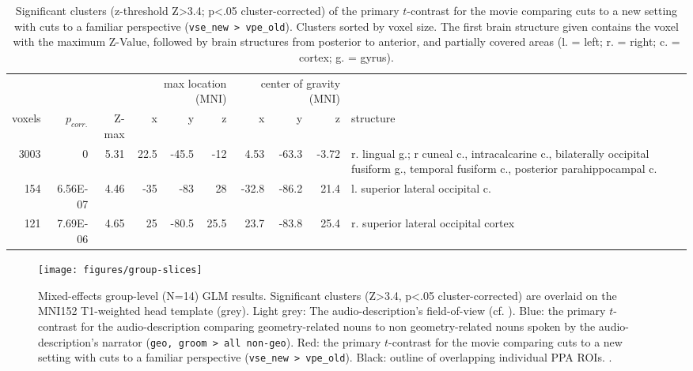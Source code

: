 \documentclass[english]{article}
\begin{document}
\begin{table}[t]
    \caption{Significant clusters (z-threshold Z>3.4; p<.05 cluster-corrected)
        of the primary $t$-contrast for the movie comparing cuts to a new
        setting with cuts to a familiar perspective (\texttt{vse\_new >
        vpe\_old}).
Clusters sorted by voxel size.
The first brain structure given contains the voxel with the maximum Z-Value,
followed by brain structures from posterior to anterior, and partially covered
areas (l. = left; r. = right; c. = cortex; g. = gyrus).}
\label{tab:res-av-group1}
\begin{tabular}{rrrrrrrrrp{3cm}}
\toprule
& & & \multicolumn{3}{r}{max location (MNI)} & \multicolumn{3}{r}{center of gravity (MNI)} &
\\ \cmidrule{4-6} \cmidrule{7-9}
voxels & $p_{corr.}$ & Z-max & x & y & z  & x & y & z & structure \\
\midrule
3003 & 0 & 5.31 & 22.5 & -45.5 & -12 & 4.53 & -63.3 & -3.72 & r. lingual g.; r
cuneal c., intracalcarine c., bilaterally occipital fusiform g., temporal fusiform c., posterior parahippocampal c.  \\
154 & 6.56E-07 & 4.46 & -35 & -83 & 28 & -32.8 & -86.2 & 21.4 & l. superior lateral occipital c. \\
121 & 7.69E-06 & 4.65 & 25 & -80.5 & 25.5 & 23.7 & -83.8 & 25.4 & r. superior lateral occipital cortex \\
\bottomrule
\end{tabular}
\end{table}


\begin{figure} \centering
    \texttt{[image: figures/group-slices]}
    \caption{Mixed-effects group-level (N=14) GLM results. Significant clusters
        (Z>3.4, p<.05 cluster-corrected) are overlaid on the MNI152 T1-weighted
        head template (grey).
        Light grey: The audio-description's field-of-view
        (cf. \citep{hanke2014audiomovie}).
        Blue: the primary $t$-contrast for the audio-description comparing
        geometry-related nouns to non geometry-related nouns spoken by the
        audio-description's narrator (\texttt{geo, groom > all non-geo}).
        Red: the primary $t$-contrast for the movie comparing cuts to a new
        setting with cuts to a familiar perspective (\texttt{vse\_new >
        vpe\_old}).
        Black: outline of overlapping individual PPA ROIs.
        \citep{sengupta2016extension}.}
    \label{fig:group-slices}
\end{figure}
\end{document}
